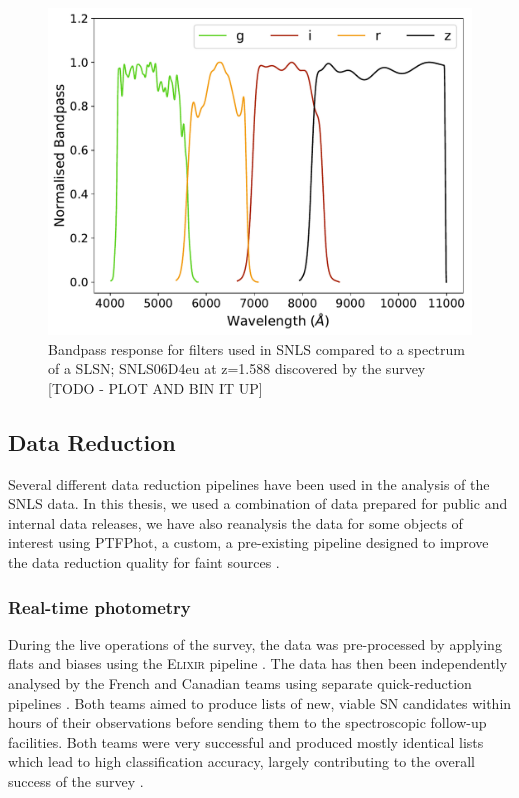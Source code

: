 \begin{figure}
  \centering
  \includegraphics[scale=0.8]{Figures/Chapter2/SNLS_filters.pdf}
    \caption{Bandpass response for filters used in SNLS compared to a spectrum of a SLSN; SNLS06D4eu at z=1.588 discovered by the survey [TODO - PLOT AND BIN IT UP]}
    \label{fig:SNLSFilters}
\end{figure}

\subsection{Data Reduction}
Several different data reduction pipelines have been used in the analysis of the SNLS data. In this thesis, we used a combination of data prepared for public and internal data releases, we have also reanalysis the data for some objects of interest using PTFPhot, a custom, a pre-existing pipeline designed to improve the data reduction quality for faint sources \citep{Firth2015}.

\subsubsection{Real-time photometry}
During the live operations of the survey, the data was pre-processed by applying flats and biases using the \textsc{Elixir} pipeline \citep{Magnier2004}. The data has then been independently analysed by the French and Canadian teams using separate quick-reduction pipelines \citep{Astier2006,Bazin2011}. Both teams aimed to produce lists of new, viable SN candidates within hours of their observations before sending them to the spectroscopic follow-up facilities. Both teams were very successful and produced mostly identical lists which lead to high classification accuracy, largely contributing to the overall success of the survey \citep{Pritchet2004}.

